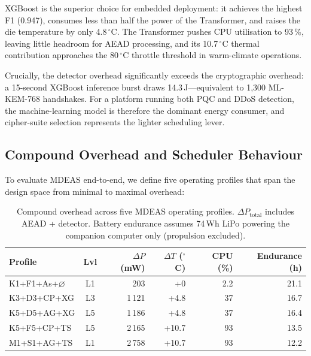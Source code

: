 \documentclass[conference]{IEEEtran}
\newcommand{\mdeas}{\textsc{MDEAS}}
\begin{document}
XGBoost is the superior choice for embedded deployment: it achieves
the highest F1 (0.947), consumes less than half the power of the
Transformer, and raises the die temperature by only 4.8\,$^\circ$C.
The Transformer pushes CPU utilisation to 93\,\%, leaving little
headroom for AEAD processing, and its 10.7\,$^\circ$C thermal
contribution approaches the 80\,$^\circ$C throttle threshold in
warm-climate operations.

Crucially, the detector overhead significantly exceeds the
cryptographic overhead: a 15-second XGBoost inference burst draws
14.3\,J---equivalent to 1{,}300 ML-KEM-768 handshakes.  For a
platform running both PQC and DDoS detection, the machine-learning
model is therefore the dominant energy consumer, and cipher-suite
selection represents the lighter scheduling lever.


\subsection{Compound Overhead and Scheduler Behaviour}
\label{sec:compound}

To evaluate \mdeas{} end-to-end, we define five operating profiles
that span the design space from minimal to maximal overhead:

\begin{table}[t]
\centering
\caption{Compound overhead across five \mdeas{} operating profiles.
  $\Delta P_\text{total}$ includes AEAD + detector.
  Battery endurance assumes 74\,Wh LiPo powering the companion
  computer only (propulsion excluded).}
\label{tab:profiles}
\footnotesize
\setlength{\tabcolsep}{2.2pt}
\begin{tabular}{@{}l c  r r r r@{}}
\toprule
\textbf{Profile} & \textbf{Lvl}
  & $\Delta P$ (mW) & $\Delta T$ ($^\circ$C)
  & CPU (\%) & Endurance (h) \\
\midrule
\rowcolor{bestcell}
K1+F1+As+$\varnothing$ & L1
  & 203 & +0 & 2.2 & 21.1 \\
K3+D3+CP+XG & L3
  & 1\,121 & +4.8 & 37 & 16.7 \\
K5+D5+AG+XG & L5
  & 1\,186 & +4.8 & 37 & 16.4 \\
\rowcolor{warncell}
K5+F5+CP+TS & L5
  & 2\,165 & +10.7 & 93 & 13.5 \\
\rowcolor{worstcell}
M1+S1+AG+TS & L1
  & 2\,758 & +10.7 & 93 & 12.2 \\
\bottomrule
\end{tabular}
\end{table}
\end{document}
